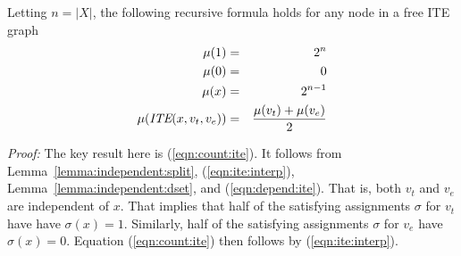\documentclass{llncs}
\newcommand{\tautology}{1}
\newcommand{\nil}{0}
\newcommand{\ite}{\mbox{\it ITE}}
\newcommand{\interp}{\sigma}
\newcommand{\mcount}{\mu}
\begin{document}
\begin{theorem}
\label{theorem:count}
Letting $n = |X|$, the following recursive formula holds for any node in a free ITE graph
\begin{eqnarray}
\mcount(\tautology) & = & 2^{n} \label{eqn:count:true}\\
\mcount(\nil) & = & 0 \label{eqn:count:false}\\
\mcount(x) & = & 2^{n-1} \label{eqn:count:variable}\\
\mcount(\ite(x, v_t, v_e)) & = & \frac{\mcount(v_t) + \mcount(v_e)}{2} \label{eqn:count:ite}
\end{eqnarray}  
\end{theorem}
\noindent
{\em Proof:} The key result here is (\ref{eqn:count:ite}).  It follows
from Lemma~\ref{lemma:independent:split}, (\ref{eqn:ite:interp}),
Lemma~\ref{lemma:independent:dset}, and (\ref{eqn:depend:ite}).  That is, both
$v_t$ and $v_e$ are independent of $x$.  That implies that half of the
satisfying assignments $\interp$ for $v_t$ have have $\interp(x) =
\tautology$.  Similarly, half of the satisfying assignments $\interp$
for $v_e$ have $\interp(x) = \nil$.  Equation (\ref{eqn:count:ite}) then follows by (\ref{eqn:ite:interp}).


\end{document}
